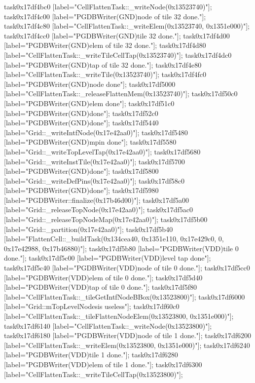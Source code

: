 {	task0x17df4bc0 [label="CellFlattenTask::_writeNode(0x13523740)"];
	task0x17df4c00 [label="PGDBWriter(GND)\nCell node of tile 32 done."];
	task0x17df4c80 [label="CellFlattenTask::_writeElem(0x13523740, 0x1351e000)"];
	task0x17df4cc0 [label="PGDBWriter(GND)\nCell tile 32 done."];
	task0x17df4d00 [label="PGDBWriter(GND)\nCell elem of tile 32 done."];
	task0x17df4d80 [label="CellFlattenTask::_writeTileCellTap(0x13523740)"];
	task0x17df4dc0 [label="PGDBWriter(GND)\nCell tap of tile 32 done."];
	task0x17df4e80 [label="CellFlattenTask::_writeTile(0x13523740)"];
	task0x17df4fc0 [label="PGDBWriter(GND)\nCell node done"];
	task0x17df5000 [label="CellFlattenTask::_releaseFlattenMem(0x13523740)"];
	task0x17df50c0 [label="PGDBWriter(GND)\nCell elem done"];
	task0x17df51c0 [label="PGDBWriter(GND)\nTap done"];
	task0x17df52c0 [label="PGDBWriter(GND)\nTile done"];
	task0x17df5440 [label="Grid::_writeIntfNode(0x17e42aa0)"];
	task0x17df5480 [label="PGDBWriter(GND)\nNormal mpin done"];
	task0x17df5580 [label="Grid::_writeTopLevelTap(0x17e42aa0)"];
	task0x17df5680 [label="Grid::_writeInstTile(0x17e42aa0)"];
	task0x17df5700 [label="PGDBWriter(GND)\nibb done"];
	task0x17df5800 [label="Grid::_writeDefPins(0x17e42aa0)"];
	task0x17df58c0 [label="PGDBWriter(GND)\nmpin done"];
	task0x17df5980 [label="PGDBWriter::finalize(0x17b46d00)"];
	task0x17df5a00 [label="Grid::_releaseTopNode(0x17e42aa0)"];
	task0x17df5ac0 [label="Grid::_releaseTopNodeMap(0x17e42aa0)"];
	task0x17df5b00 [label="Grid::_partition(0x17e42aa0)"];
	task0x17df5b40 [label="FlattenCell::_buildTask(0x134cea40, 0x1351e110, 0x17e429c0, 0, 0x17e42988, 0x17b46880)"];
	task0x17df5b80 [label="PGDBWriter(VDD)\nCell tile 0 done."];
	task0x17df5c00 [label="PGDBWriter(VDD)\nTop level tap done"];
	task0x17df5c40 [label="PGDBWriter(VDD)\nCell node of tile 0 done."];
	task0x17df5cc0 [label="PGDBWriter(VDD)\nCell elem of tile 0 done."];
	task0x17df5d40 [label="PGDBWriter(VDD)\nCell tap of tile 0 done."];
	task0x17df5f80 [label="CellFlattenTask::_tileGetIntfNodeBBox(0x13523800)"];
	task0x17df6000 [label="Grid::mTopLevelNodes\nVDD is useless"];
	task0x17df60c0 [label="CellFlattenTask::_tileFlattenNodeElem(0x13523800, 0x1351e000)"];
	task0x17df6140 [label="CellFlattenTask::_writeNode(0x13523800)"];
	task0x17df6180 [label="PGDBWriter(VDD)\nCell node of tile 1 done."];
	task0x17df6200 [label="CellFlattenTask::_writeElem(0x13523800, 0x1351e000)"];
	task0x17df6240 [label="PGDBWriter(VDD)\nCell tile 1 done."];
	task0x17df6280 [label="PGDBWriter(VDD)\nCell elem of tile 1 done."];
	task0x17df6300 [label="CellFlattenTask::_writeTileCellTap(0x13523800)"];
}
